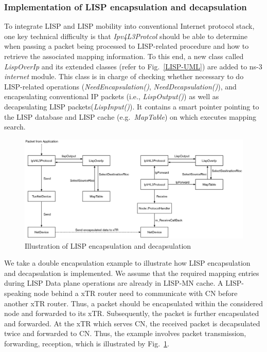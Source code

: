 \subsubsection{Implementation of LISP encapsulation and decapsulation}
To integrate LISP and LISP mobility into conventional Internet protocol stack, one key technical difficulty is that \emph{Ipv4L3Protcol} should be able to determine when passing a packet being processed to LISP-related procedure and how to retrieve the associated mapping information. To this end, a new class called \emph{LispOverIp} and its extended classes (refer to Fig.~\ref{LISP-UML}) are added to ns-3 \emph{internet} module. This class is in charge of checking whether necessary to do LISP-related operations (\emph{NeedEncapsulation()}, \emph{NeedDecapsulation()}), and encapsulating conventional IP packets (i.e., \emph{LispOutput()}) as well as decapsulating LISP packets(\emph{LispInput()}). It contains a smart pointer pointing to the LISP database and LISP cache (e.g.~\emph{MapTable}) on which executes mapping search.
\begin{figure}[!t]
	\centering
	\includegraphics[width=\textwidth]{Pics/ns3_lisp_data_plane.eps}
	\caption{Illustration of LISP encapsulation and decapsulation}
	\label{fig:ns3-lisp-data-plane}
\end{figure}

We take a double encapsulation example to illustrate how LISP encapsulation and decapsulation is implemented. We assume that the required mapping entries during LISP Data plane operations are already in LISP-MN cache. A LISP-speaking node behind a xTR router need to communicate with CN before another xTR router. Thus, a packet should be encapsulated within the considered node and forwarded to its xTR. Subsequently, the packet is further encapsulated and forwarded. At the xTR which serves CN, the received packet is decapsulated twice and forwarded to CN. Thus, the example involves packet transmission, forwarding, reception, which is illustrated by Fig.~\ref{fig:ns3-lisp-data-plane}. 

